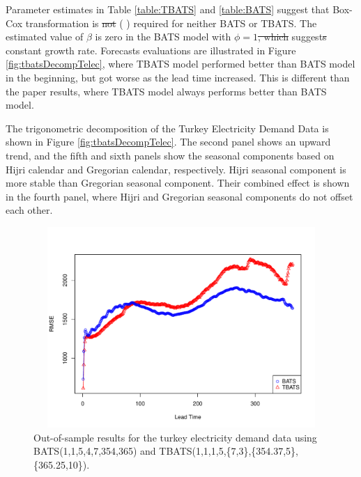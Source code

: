 \documentclass{uwstat572}
\newcommand{\vmdel}[1]{\sout{#1}}
\newcommand{\vmadd}[1]{\textbf{\color{red}{#1}}}
\newcommand{\vmcomment}[1]{({\color{blue}{VM's comment:}} \textbf{\color{blue}{#1}})}
\begin{document}
Parameter estimates in Table \ref{table:TBATS} and \ref{table:BATS} suggest that Box-Cox transformation is \vmdel{not} \vmcomment{double negation} required for neither BATS or TBATS. The estimated value of $\beta$ is zero in the BATS model with $\phi=1$\vmdel{, which} suggest\vmdel{s} \vmadd{a} constant growth rate. Forecasts evaluations are illustrated in Figure \ref{fig:tbatsDecompTelec}, where TBATS model performed better than BATS model in the beginning, but got worse as the lead time increased. This is different than the paper results, where TBATS model always performs better than BATS model.

The trigonometric decomposition of the Turkey Electricity Demand Data is shown in Figure \ref{fig:tbatsDecompTelec}. The second panel shows an upward trend, and the fifth and sixth panels show the seasonal components based on Hijri calendar and Gregorian calendar, respectively. 
\vmadd{The} Hijri seasonal component is more stable than \vmadd{the} Gregorian seasonal component. 
Their combined effect is shown in the fourth panel, where \vmadd{the} Hijri and Gregorian seasonal components do not offset each other.

\begin{figure}[]
\centering
  \includegraphics[width=6in,height=3in]{telecRMSE.pdf}
  \caption{Out-of-sample results for the turkey electricity demand data using BATS(1,1,5,4,7,354,365) and TBATS(1,1,1,5,\{7,3\},\{354.37,5\},\{365.25,10\}).}
  \label{fig:telecRMSE}
\end{figure}
\end{document}
